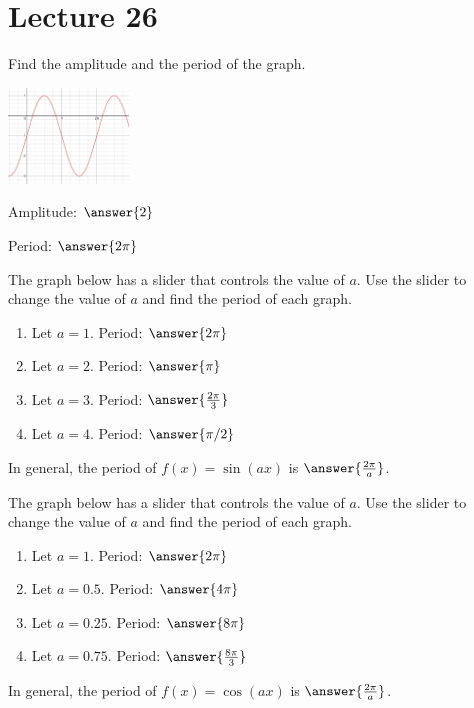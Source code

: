 \documentclass{ximera}
\begin{document}
 
 
 
 
 
 
  \section{Lecture 26}
  \begin{problem}\label{prob:160hom11prob2}
  Find the amplitude and the period of the graph.
  \begin{image}
   
\includegraphics[height=1in]{160H11pic2.jpg}~
 
\end{image}
Amplitude: $\answer{2}$

Period: $\answer{2\pi}$
  \end{problem}
  
 \begin{problem}\label{prob:160hom11prob3}  
 The graph below has a slider that controls the value of $a$.  Use the slider to change the value of $a$ and find the period of each graph.
  \begin{center} 
\end{center}
\begin{enumerate}
    \item Let $a=1$.  Period: $\answer{2\pi}$
    \item Let $a=2$.  Period: $\answer{\pi}$
    \item Let $a=3$.  Period: $\answer{\frac{2\pi}{3}}$
    \item Let $a=4$.  Period: $\answer{\pi/2}$
\end{enumerate}
In general, the period of $f(x)=\sin (ax)$ is $\answer{\frac{2\pi}{a}}$.
\end{problem}

\begin{problem}\label{prob:160hom11prob4}  
 The graph below has a slider that controls the value of $a$.  Use the slider to change the value of $a$ and find the period of each graph.
  \begin{center} 
\end{center}
\begin{enumerate}
    \item Let $a=1$.  Period: $\answer{2\pi}$
    \item Let $a=0.5$.  Period: $\answer{4\pi}$
    \item Let $a=0.25$.  Period: $\answer{8\pi}$
    \item Let $a=0.75$.  Period: $\answer{\frac{8\pi}{3}}$
\end{enumerate}
In general, the period of $f(x)=\cos (ax)$ is $\answer{\frac{2\pi}{a}}$.
\end{problem}
\end{document}
